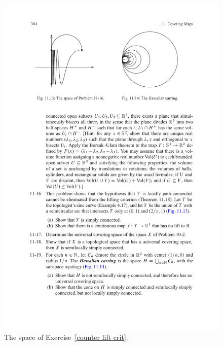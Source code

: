 \begin{figure}[htbp]
\centering
\begin{minipage}{200pt}
\centering
\includegraphics{sine-curve}
\caption{The space of Exercise~\ref{counter lift crit}.}
\end{minipage}
\hspace{20pt}
\begin{minipage}{200pt}
\centering

\end{minipage}
\end{figure}
